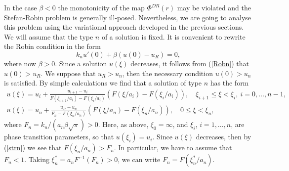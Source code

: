 \documentclass[12pt]{article}
\theoremstyle{plain}
\theoremstyle{definition}
\numberwithin{equation}{section}
\begin{document}
In the case $\beta<0$ the monotonicity of the map $\Phi^{DR}(r)$ may be violated and the Stefan-Robin problem is generally ill-posed. Nevertheless, we are going to analyse this problem using the variational approach developed in the previous sections. We will assume that the type $n$ of a solution is fixed. It is convenient to rewrite the Robin condition in the form
\begin{equation}\label{Robn}
k_n u'(0)+\beta(u(0)-u_R)=0,
\end{equation}
where now $\beta>0$. Since a solution $u(\xi)$ decreases, it follows from (\ref{Robn}) that $u(0)>u_R$. We suppose that $u_R>u_n$, then the necessary condition $u(0)>u_n$ is satisfied. By simple calculations we find that a solution of type $n$ has the form
\begin{align}\label{stri}
u(\xi)=u_i+\frac{u_{i+1}-u_i}{F(\xi_{i+1}/a_i)-F(\xi_i/a_i)}(F(\xi/a_i)-F(\xi_i/a_i)), \quad
\xi_{i+1}\le\xi<\xi_i, \ i=0,\ldots,n-1, \\
\label{strn}
u(\xi)=u_n+\frac{u_R-u_n}{F_n-F(\xi_n/a_n)}(F(\xi/a_n)-F(\xi_n/a_n)), \quad 0\le\xi<\xi_n,
\end{align}
where $F_n=k_n/(a_n\beta\sqrt{\pi})>0$. Here, as above, $\xi_0=\infty$, and $\xi_i$, $i=1,\ldots,n$, are phase transition parameters, so that $u(\xi_i)=u_i$. Since $u(\xi)$ decreases, then by (\ref{strn}) we see that $F(\xi_n/a_n)>F_n$. In particular, we have to assume that $F_n<1$. Taking $\xi^*_n=a_nF^{-1}(F_n)>0$, we can write $F_n=F(\xi^*_n/a_n)$.
\end{document}
